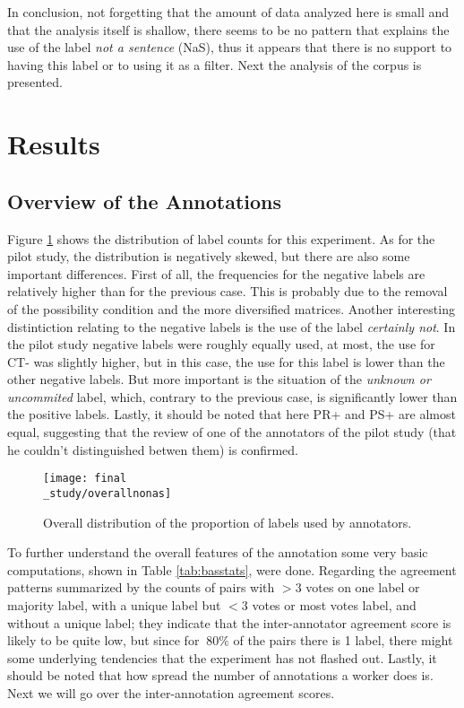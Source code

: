 In conclusion, not forgetting that the amount of data analyzed here is small and that the analysis itself is shallow, there seems to be no pattern that explains the use of the label \textit{not a sentence} (NaS), thus it appears that there is no support to having this label or to using it as a filter. Next the analysis of the corpus is presented.\\ 

\section{Results}
\subsection{Overview of the Annotations}\label{subsect:overview}
Figure \ref{fig:allbar} shows the distribution of label counts for this experiment. As for the pilot study, the distribution is negatively skewed, but there are also some important differences. First of all, the frequencies for the negative labels are relatively higher than for the previous case. This is probably due to the removal of the possibility condition and the more diversified matrices. Another interesting distintiction relating to the negative labels is the use of the label \textit{certainly not}. In the pilot study negative labels were roughly equally used, at most, the use for CT- was slightly higher, but in this case, the use for this label is lower than the other negative labels. But more important is the situation of the \textit{unknown or uncommited} label, which, contrary to the previous case, is significantly lower than the positive labels. Lastly, it should be noted that here PR+ and PS+ are almost equal, suggesting that the review of one of the annotators of the pilot study (that he couldn't distinguished betwen them) is confirmed.\\

\begin{figure}
\centering
\parbox{10cm}{\texttt{[image: final\\\_study/overallnonas]}
\caption{Overall distribution of the proportion of labels used by annotators.}\label{fig:allbar}}
\qquad
\end{figure}

To further understand the overall features of the annotation some very basic computations, shown in Table \ref{tab:basstats}, were done. Regarding the agreement patterns summarized by the counts of pairs with $>3$ votes on one label or majority label, with a unique label but $<3$ votes or most votes label, and without a unique label; they indicate that the inter-annotator agreement score is likely to be quite low, but since for $~80\%$ of the pairs there is 1 label, there might some underlying tendencies that the experiment has not flashed out. Lastly, it should be noted that how spread the number of annotations a worker does is. Next we will go over the inter-annotation agreement scores.\\ 

